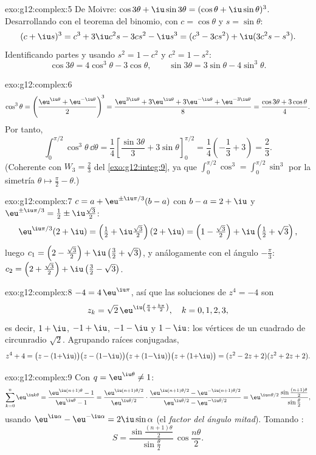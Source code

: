 \begin{solution}{exo:g12:complex:5}
De Moivre: $\cos3\theta + \iu\sin3\theta = (\cos\theta + \iu\sin\theta)^3$.
Desarrollando con el teorema del binomio, con $c = \cos\theta$ y
$s = \sin\theta$:
\[
(c + \iu s)^3 = c^3 + 3\iu c^2 s - 3 c s^2 - \iu s^3
= (c^3 - 3cs^2) + \iu(3c^2 s - s^3).
\]
Identificando partes y usando $s^2 = 1 - c^2$ y $c^2 = 1 - s^2$:
\[
\cos3\theta = 4\cos^3\theta - 3\cos\theta,
\qquad
\sin3\theta = 3\sin\theta - 4\sin^3\theta .
\]
\end{solution}

\begin{solution}{exo:g12:complex:6}
\[
\cos^3\theta = \left(\frac{\eu^{\iu\theta} + \eu^{-\iu\theta}}{2}\right)^{\!3}
= \frac{\eu^{3\iu\theta} + 3\eu^{\iu\theta} + 3\eu^{-\iu\theta} + \eu^{-3\iu\theta}}{8}
= \frac{\cos3\theta + 3\cos\theta}{4}.
\]
Por tanto,
\[
\int_0^{\pi/2}\cos^3\theta\,\dd\theta
= \frac14\left[\frac{\sin3\theta}{3} + 3\sin\theta\right]_0^{\pi/2}
= \frac14\left(-\frac13 + 3\right) = \frac{2}{3}.
\]
(Coherente con $W_3 = \frac23$ del \cref{exo:g12:integ:9}, ya que
$\int_0^{\pi/2}\cos^3 = \int_0^{\pi/2}\sin^3$ por la simetría
$\theta \mapsto \frac\pi2 - \theta$.)
\end{solution}

\begin{solution}{exo:g12:complex:7}
$c = a + \eu^{\pm\iu\pi/3}(b - a)$ con $b - a = 2 + \iu$ y
$\eu^{\pm\iu\pi/3} = \frac12 \pm \iu\frac{\sqrt3}{2}$:
\[
\eu^{\iu\pi/3}(2+\iu) = \left(\tfrac12 + \iu\tfrac{\sqrt3}{2}\right)(2+\iu)
= \left(1 - \tfrac{\sqrt3}{2}\right) + \iu\left(\tfrac12 + \sqrt3\right),
\]
luego $c_1 = \left(2 - \frac{\sqrt3}{2}\right) +
\iu\left(\frac32 + \sqrt3\right)$, y análogamente con el ángulo
$-\frac\pi3$:
$c_2 = \left(2 + \frac{\sqrt3}{2}\right) + \iu\left(\frac32 - \sqrt3\right)$.
\end{solution}

\begin{solution}{exo:g12:complex:8}
$-4 = 4\,\eu^{\iu\pi}$, así que las soluciones de $z^4 = -4$ son
\[
z_k = \sqrt2\,\eu^{\iu\left(\frac\pi4 + \frac{k\pi}{2}\right)},
\quad k = 0, 1, 2, 3,
\]
es decir, $1 + \iu$, $-1 + \iu$, $-1 - \iu$ y $1 - \iu$: los vértices de un
cuadrado de circunradio $\sqrt 2$. Agrupando raíces conjugadas,
\[
z^4 + 4 = \bigl(z - (1{+}\iu)\bigr)\bigl(z - (1{-}\iu)\bigr)
\bigl(z + (1{-}\iu)\bigr)\bigl(z + (1{+}\iu)\bigr)
= (z^2 - 2z + 2)(z^2 + 2z + 2).
\]
\end{solution}

\begin{solution}{exo:g12:complex:9}
Con $q = \eu^{\iu\theta} \neq 1$:
\[
\sum_{k=0}^{n} \eu^{\iu k\theta} = \frac{\eu^{\iu(n+1)\theta} - 1}{\eu^{\iu\theta} - 1}
= \frac{\eu^{\iu(n+1)\theta/2}}{\eu^{\iu\theta/2}}
\cdot\frac{\eu^{\iu(n+1)\theta/2} - \eu^{-\iu(n+1)\theta/2}}{\eu^{\iu\theta/2} - \eu^{-\iu\theta/2}}
= \eu^{\iu n\theta/2}\,
\frac{\sin\frac{(n+1)\theta}{2}}{\sin\frac{\theta}{2}},
\]
usando $\eu^{\iu\alpha} - \eu^{-\iu\alpha} = 2\iu\sin\alpha$ (el
\emph{factor del ángulo mitad}). Tomando :
\[
S = \frac{\sin\frac{(n+1)\theta}{2}}{\sin\frac{\theta}{2}}\,
\cos\frac{n\theta}{2}.
\]
\end{solution}

